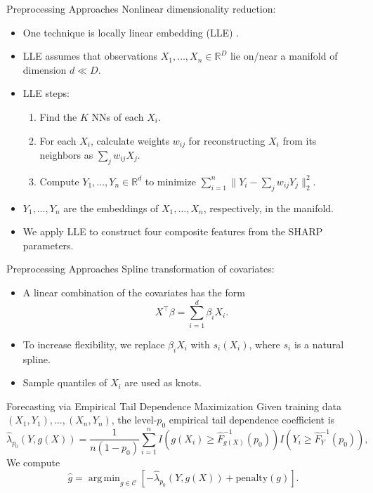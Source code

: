 \documentclass{beamer}
\def\R{\mathbb R}
\DeclareMathOperator*{\argmin}{arg\,min}
\begin{document}
\begin{frame}{Preprocessing Approaches}
    Nonlinear dimensionality reduction:
    \begin{itemize}
        \item One technique is locally linear embedding (LLE) \cite{roweis2000nonl}.
        \item LLE assumes that observations $X_1, \ldots, X_n \in \R^D$ lie on/near a manifold of dimension $d \ll D$.
        \item LLE steps:
        \begin{enumerate}
            \item Find the $K$ NNs of each $X_i$.
            \item For each $X_i$, calculate weights $w_{i j}$ for reconstructing $X_i$ from its neighbors as $\sum_j w_{i j}X_j$.
            \item Compute $Y_1, \ldots, Y_n \in \R^d$ to minimize $\sum_{i = 1}^n \|Y_i - \sum_j w_{i j}Y_j\|_2^2$.
        \end{enumerate}
        \item $Y_1, \ldots, Y_n$ are the embeddings of $X_1, \ldots, X_n$, respectively, in the manifold.
        \item We apply LLE to construct four composite features from the SHARP parameters.
    \end{itemize}
\end{frame}

\begin{frame}{Preprocessing Approaches}
    Spline transformation of covariates:
    \begin{itemize}
        \item A linear combination of the covariates has the form
        \[
        X^{\top}\beta = \sum_{i = 1}^d \beta_i X_i.
        \]
        \item To increase flexibility, we replace $\beta_i X_i$ with $s_i(X_i)$, where $s_i$ is a natural spline.
        \item Sample quantiles of $X_i$ are used as knots.
    \end{itemize}
\end{frame}

\begin{frame}{Forecasting via Empirical Tail Dependence Maximization}
    Given training data $(X_1, Y_1), \ldots, (X_n, Y_n)$, the level-$p_0$ empirical tail dependence coefficient is
    \[
    \hat{\lambda}_{p_0}(Y, g(X)) = \frac{1}{n(1 - p_0)}\sum_{i = 1}^n I(g(X_i) \ge \hat{F}_{g(X)}^{-1}(p_0))I(Y_i \ge \hat{F}_{Y}^{-1}(p_0)),
    \]
    We compute
    \[
    \hat{g} = \argmin_{g \in \mathcal{C}} \left[-\hat{\lambda}_{p_0}(Y, g(X)) + \text{penalty}(g)\right].
    \]
\end{frame}
\end{document}
